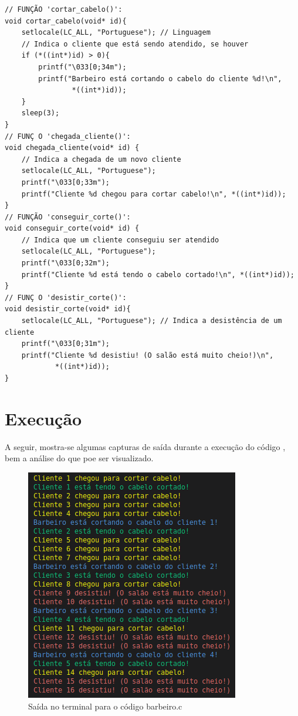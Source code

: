 \documentclass[
	12pt,				%
	openright,			%
	oneside,			%
	a4paper,			%
	chapter=TITLE,		%
	english,			%
	french,				%
	spanish,			%
	brazil				%
	]{abntex2}
\theoremstyle{definition}
\begin{document}
\begin{verbatim}
// FUNÇÃO 'cortar_cabelo()':
void cortar_cabelo(void* id){
    setlocale(LC_ALL, "Portuguese"); // Linguagem
    // Indica o cliente que está sendo atendido, se houver
    if (*((int*)id) > 0){ 
        printf("\033[0;34m");
        printf("Barbeiro está cortando o cabelo do cliente %d!\n", 
                *((int*)id));
    }
    sleep(3);
}
// FUNÇ O 'chegada_cliente()':
void chegada_cliente(void* id) {
    // Indica a chegada de um novo cliente
    setlocale(LC_ALL, "Portuguese"); 
    printf("\033[0;33m");
    printf("Cliente %d chegou para cortar cabelo!\n", *((int*)id));
}
// FUNÇÃO 'conseguir_corte()':
void conseguir_corte(void* id) {
    // Indica que um cliente conseguiu ser atendido
    setlocale(LC_ALL, "Portuguese");
    printf("\033[0;32m");
    printf("Cliente %d está tendo o cabelo cortado!\n", *((int*)id));
}
// FUNÇ O 'desistir_corte()':
void desistir_corte(void* id){
    setlocale(LC_ALL, "Portuguese"); // Indica a desistência de um cliente
    printf("\033[0;31m");
    printf("Cliente %d desistiu! (O salão está muito cheio!)\n", 
            *((int*)id));
}
\end{verbatim}
\section{Execução}
A seguir, mostra-se algumas capturas de saída durante a execução do código , bem a análise do que poe ser visualizado.

\begin{figure}[h]
    \centering
    \includegraphics{imagens/out_barbeiro.png}
    \caption{Saída no terminal para o código barbeiro.c}
    \label{fig:out_barbeiro.c}
\end{figure}
\end{document}
